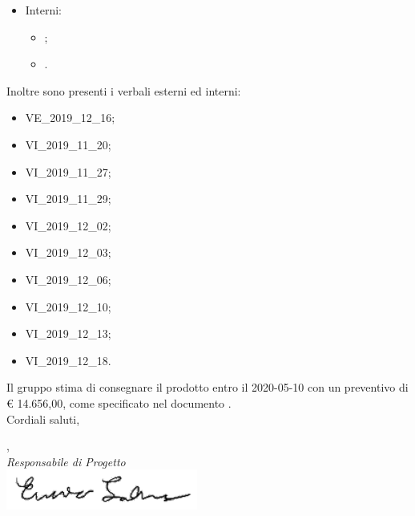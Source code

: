 \documentclass[12pt]{letter}
\begin{document}
\begin{letter}
\begin{itemize}
\begin{itemize}
            \item \PdP{};
            \item \PdQ{}.
        \end{itemize}
        \item Interni:
        \begin{itemize}
            \item \NdP{};
            \item \SdF{}.
        \end{itemize}
    \end{itemize}
        Inoltre sono presenti i verbali esterni ed interni:
        \begin{itemize}
            \item VE\_2019\_12\_16;
            \item VI\_2019\_11\_20;
            \item VI\_2019\_11\_27;
            \item VI\_2019\_11\_29;
            \item VI\_2019\_12\_02;
            \item VI\_2019\_12\_03;
            \item VI\_2019\_12\_06;
            \item VI\_2019\_12\_10;
            \item VI\_2019\_12\_13;
            \item VI\_2019\_12\_18.
        \end{itemize}
        Il gruppo stima di consegnare il prodotto entro il 2020-05-10 con un preventivo di \euro{} 14.656,00, come specificato nel documento \PdP{}.\\
        Cordiali saluti,
        \closing{\SE{}, \\ \textit{Responsabile di Progetto}\\ \includegraphics[width=.6\linewidth, height=50px]{../DocumentazioneEsterna/PianoDiProgetto/sezioni/Firme/Enrico.png}}
        \vspace{10mm}
    \end{letter}
\end{document}

